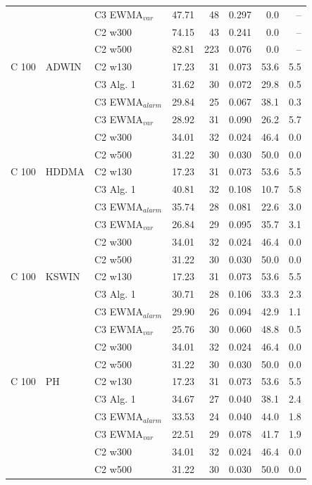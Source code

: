 \begin{longtable}{lllrrrrr}
 &  & C3 EWMA$_{var}$ & 47.71 & 48 & 0.297 & 0.0 & -- \\
 &  & C2 w300 & 74.15 & 43 & 0.241 & 0.0 & -- \\
 &  & C2 w500 & 82.81 & 223 & 0.076 & 0.0 & -- \\
\hline
C  100 & ADWIN & C2 w130 & 17.23 & 31 & 0.073 & 53.6 & 5.5 \\
 &  & C3 Alg. 1 & 31.62 & 30 & 0.072 & 29.8 & 0.5 \\
 &  & C3 EWMA$_{alarm}$ & 29.84 & 25 & 0.067 & 38.1 & 0.3 \\
 &  & C3 EWMA$_{var}$ & 28.92 & 31 & 0.090 & 26.2 & 5.7 \\
 &  & C2 w300 & 34.01 & 32 & 0.024 & 46.4 & 0.0 \\
 &  & C2 w500 & 31.22 & 30 & 0.030 & 50.0 & 0.0 \\
\hline
C  100 & HDDMA & C2 w130 & 17.23 & 31 & 0.073 & 53.6 & 5.5 \\
 &  & C3 Alg. 1 & 40.81 & 32 & 0.108 & 10.7 & 5.8 \\
 &  & C3 EWMA$_{alarm}$ & 35.74 & 28 & 0.081 & 22.6 & 3.0 \\
 &  & C3 EWMA$_{var}$ & 26.84 & 29 & 0.095 & 35.7 & 3.1 \\
 &  & C2 w300 & 34.01 & 32 & 0.024 & 46.4 & 0.0 \\
 &  & C2 w500 & 31.22 & 30 & 0.030 & 50.0 & 0.0 \\
\hline
C  100 & KSWIN & C2 w130 & 17.23 & 31 & 0.073 & 53.6 & 5.5 \\
 &  & C3 Alg. 1 & 30.71 & 28 & 0.106 & 33.3 & 2.3 \\
 &  & C3 EWMA$_{alarm}$ & 29.90 & 26 & 0.094 & 42.9 & 1.1 \\
 &  & C3 EWMA$_{var}$ & 25.76 & 30 & 0.060 & 48.8 & 0.5 \\
 &  & C2 w300 & 34.01 & 32 & 0.024 & 46.4 & 0.0 \\
 &  & C2 w500 & 31.22 & 30 & 0.030 & 50.0 & 0.0 \\
\hline
C  100 & PH & C2 w130 & 17.23 & 31 & 0.073 & 53.6 & 5.5 \\
 &  & C3 Alg. 1 & 34.67 & 27 & 0.040 & 38.1 & 2.4 \\
 &  & C3 EWMA$_{alarm}$ & 33.53 & 24 & 0.040 & 44.0 & 1.8 \\
 &  & C3 EWMA$_{var}$ & 22.51 & 29 & 0.078 & 41.7 & 1.9 \\
 &  & C2 w300 & 34.01 & 32 & 0.024 & 46.4 & 0.0 \\
 &  & C2 w500 & 31.22 & 30 & 0.030 & 50.0 & 0.0 \\

\end{longtable}
